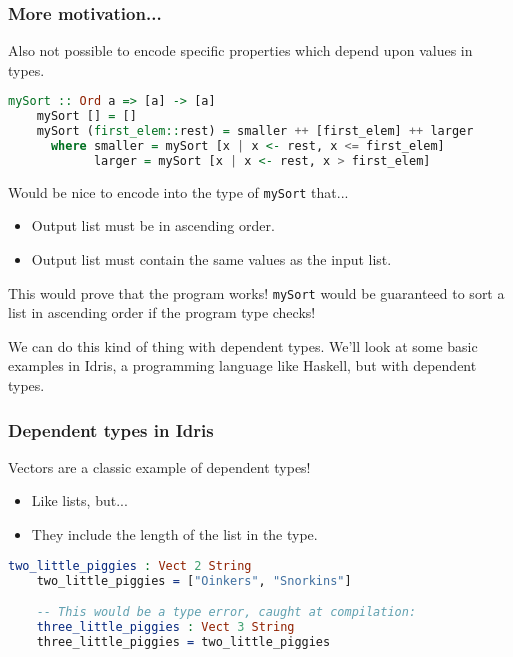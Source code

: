 \documentclass{beamer}
\begin{document}
\begin{frame}[fragile]
  \frametitle{More motivation...}

  Also not possible to encode specific properties which depend upon values in types.

  \begin{lstlisting}[frame=single, language=Haskell, breaklines=true, basicstyle=\ttfamily\tiny]
    mySort :: Ord a => [a] -> [a]
    mySort [] = []
    mySort (first_elem::rest) = smaller ++ [first_elem] ++ larger
      where smaller = mySort [x | x <- rest, x <= first_elem]
            larger = mySort [x | x <- rest, x > first_elem]
  \end{lstlisting}

  \pause
  Would be nice to encode into the type of \texttt{mySort} that...
  
  \begin{itemize}
  \item Output list must be in ascending order.
  \item Output list must contain the same values as the input list.
  \end{itemize}

  \pause

  This would prove that the program works! \texttt{mySort} would be
  guaranteed to sort a list in ascending order if the program type
  checks!

  \pause

  We can do this kind of thing with dependent types. We'll look at
  some basic examples in Idris, a programming language like Haskell, but
  with dependent types.
\end{frame}

\begin{frame}[fragile]
  \frametitle{Dependent types in Idris}

  Vectors are a classic example of dependent types!

  \begin{itemize}
  \pause
  \item Like lists, but...
  \pause
  \item They include the length of the list in the type.
  \end{itemize}

  \begin{lstlisting}[frame=single, language=Idris, breaklines=true, basicstyle=\ttfamily\tiny]
    two_little_piggies : Vect 2 String
    two_little_piggies = ["Oinkers", "Snorkins"]

    -- This would be a type error, caught at compilation:
    three_little_piggies : Vect 3 String
    three_little_piggies = two_little_piggies
  \end{lstlisting}
\end{frame}
\end{document}
